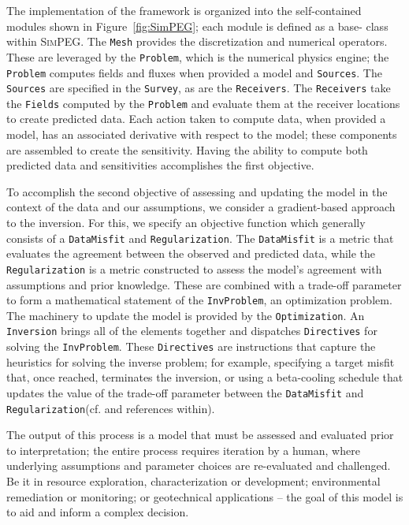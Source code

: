 \documentclass[preprint,review,3p,times,onecolumn,authoryear]{elsarticle}
\newcommand{\SimPEG}{\textsc{SimPEG}\xspace}
\newcommand{\Mesh}{\texttt{Mesh}\xspace}
\newcommand{\Survey}{\texttt{Survey}\xspace}
\newcommand{\Problem}{\texttt{Problem}\xspace}
\newcommand{\Regularization}{\texttt{Regularization}\xspace}
\newcommand{\DataMisfit}{\texttt{DataMisfit}\xspace}
\newcommand{\Optimization}{\texttt{Optimization}\xspace}
\newcommand{\InvProblem}{\texttt{InvProblem}\xspace}
\newcommand{\Inversion}{\texttt{Inversion}\xspace}
\newcommand{\Sources}{\texttt{Sources}\xspace}
\newcommand{\Receivers}{\texttt{Receivers}\xspace}
\newcommand{\Fields}{\texttt{Fields}\xspace}
\begin{document}
The implementation of the framework is organized into the self-contained
modules shown in Figure~\ref{fig:SimPEG}; each module is defined as a base-
class within \SimPEG. The \Mesh provides the discretization and numerical
operators. These are leveraged by the \Problem, which is the numerical physics
engine; the \Problem computes fields and fluxes when provided a model and \Sources. The
\Sources are specified in the \Survey, as are the \Receivers. The \Receivers
take the \Fields computed by the \Problem and evaluate them at the receiver
locations to create predicted data. Each action taken to compute data, when
provided a model, has an associated derivative with respect to the model;
these components are assembled to create the sensitivity. Having the ability
to compute both predicted data and sensitivities accomplishes the first
objective.

To accomplish the second objective of assessing and updating the model in the context of the
data and our assumptions, we consider a gradient-based approach to the
inversion. For this, we specify an objective function which generally consists of a
\DataMisfit and \Regularization. The \DataMisfit is a metric that evaluates
the agreement between the observed and predicted data, while the
\Regularization is a metric constructed to assess the model's agreement with
assumptions and prior knowledge. These are combined with a trade-off parameter
to form a mathematical statement of the \InvProblem, an optimization problem.
The machinery to update the model is provided by the \Optimization. An
\Inversion brings all of the elements together and dispatches \texttt{Directives}
for solving the \InvProblem. These \texttt{Directives} are
instructions that capture the heuristics for solving the inverse problem; for
example, specifying a target misfit that, once reached, terminates the
inversion, or using a beta-cooling schedule that updates the value of the
trade-off parameter between the \DataMisfit and \Regularization (cf.
\cite{parker1994geophysical, OldenburgTutorial} and references within).

The output of this process is a model that must be assessed and evaluated
prior to interpretation; the entire process requires iteration by a human,
where underlying assumptions and parameter choices are re-evaluated and
challenged. Be it in resource exploration, characterization or development;
environmental remediation or monitoring; or geotechnical applications -- the
goal of this model is to aid and inform a complex decision.
\end{document}

